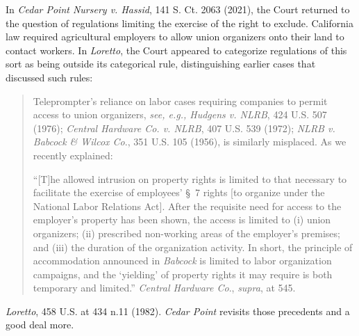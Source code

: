 In \textit{Cedar Point Nursery v. Hassid}, 141 S. Ct. 2063 (2021), the Court
returned to the question of regulations limiting the exercise of the right to
exclude. California law required agricultural employers to allow union
organizers onto their land to contact workers. In \textit{Loretto}, the Court
appeared to categorize regulations of this sort as being outside its categorical
rule, distinguishing earlier cases that discussed such rules: 
\begin{quotation}
Teleprompter's reliance on labor cases requiring companies to permit access to
union organizers, \textit{see, e.g., Hudgens v. NLRB}, 424 U.S. 507 (1976);
\textit{Central Hardware Co. v. NLRB}, 407 U.S. 539 (1972); \textit{NLRB v.
Babcock \& Wilcox Co}., 351 U.S. 105 (1956), is similarly misplaced. As we
recently explained:

``[T]he allowed intrusion on property rights is limited to that necessary to
facilitate the exercise of employees' \S~7 rights [to organize under the
National Labor Relations Act]. After the requisite need for access to the
employer's property has been shown, the access is limited to (i) union
organizers; (ii) prescribed non-working areas of the employer's premises; and
(iii) the duration of the organization activity. In short, the principle of
accommodation announced in \textit{Babcock} is limited to labor organization
campaigns, and the `yielding' of property rights it may require is both
temporary and limited.'' \textit{Central Hardware Co}., \textit{supra}, at 545.
\end{quotation}
\emph{Loretto}, 458 U.S. at 434 n.11
(1982). \textit{Cedar Point} revisits those precedents and a good deal more.


